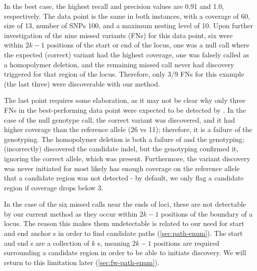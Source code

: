 In the best case, the highest recall and precision values are 0.91 and 1.0, respectively. The data point is the same in both instances, with a coverage of 60, \kmer{} size of 13, number of SNPs 100, and a maximum nesting level of 10. Upon further investigation of the nine missed variants (FNs) for this data point, six were within $2k-1$ positions of the start or end of the locus, one was a null call where the expected (correct) variant had the highest coverage, one was falsely called as a homopolymer deletion, and the remaining missed call never had \denovo{} discovery triggered for that region of the locus. Therefore, only 3/9 FNs for this example (the last three) were discoverable with our \denovo{} method.

The last point requires some elaboration, as it may not be clear why only three FNs in the best-performing data point were expected to be detected by \denovo{}. In the case of the null genotype call, the correct variant was discovered, and it had higher coverage than the reference allele (26 vs 11); therefore, it is a failure of the genotyping. The homopolymer deletion is both a failure of \denovo{} and the genotyping; \denovo{} (incorrectly) discovered the candidate indel, but the genotyping confirmed it, ignoring the correct allele, which was present. Furthermore, the variant \denovo{} discovery was never initiated for most likely has enough coverage on the reference allele that a candidate region was not detected - by default, we only flag a candidate region if coverage drops below 3.

In the case of the six missed calls near the ends of loci, these are not detectable by our current \denovo{} method as they occur within $2k-1$ positions of the boundary of a locus. The reason this makes them undetectable is related to our need for start and end anchor \kmer{}s in order to find candidate paths (\autoref{sec:path-enum}). The start and end \kmer{}s are a collection of $k$ \kmer{}s, meaning $2k-1$ positions are required surrounding a candidate region in order to be able to initiate \denovo{} discovery. We will return to this limitation later (\autoref{sec:fw-path-enum}).


